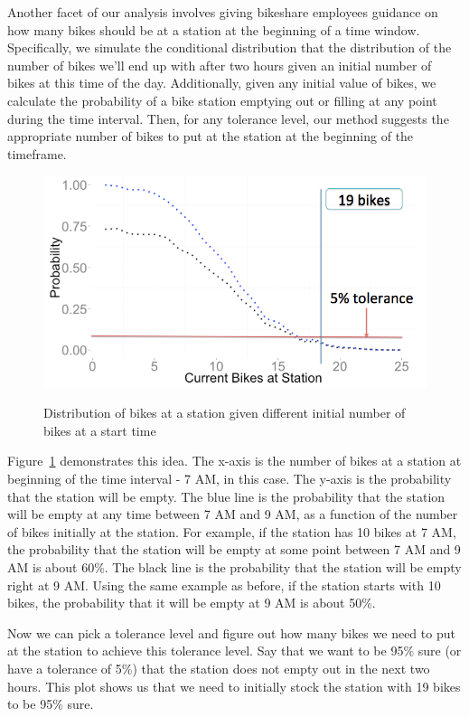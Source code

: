 \documentclass{acm_proc_article-sp}
\begin{document}
Another facet of our analysis involves giving bikeshare employees guidance on how many bikes should be at a station at the beginning of a time window. Specifically, we simulate the conditional distribution that the distribution of the number of bikes we'll end up with after two hours given an initial number of bikes at this time of the day.  Additionally, given any initial value of bikes, we calculate the probability of a bike station emptying out or filling at any point during the time interval. Then, for any tolerance level, our method suggests the appropriate number of bikes to put at the station at the beginning of the timeframe. 

\begin{figure} [!h]
\caption{Distribution of bikes at a station given different initial number of bikes at a start time}
\centering
\includegraphics[scale = 0.3]{pr_of_empty_station.png}
\label{fig:pr_of_empty_station}
\end{figure}

Figure~\ref{fig:pr_of_empty_station} demonstrates this idea. The x-axis is the number of bikes at a station at beginning of the time interval - 7 AM, in this case. The y-axis is the probability that the station will be empty. The blue line is the probability that the station will be empty at any time between 7 AM and 9 AM, as a function of the number of bikes initially at the station. For example, if the station has 10 bikes at 7 AM, the probability that the station will be empty at some point between 7 AM and 9 AM is about 60\%. The black line is the probability that the station will be empty right at 9 AM. Using the same example as before, if the station starts with 10 bikes, the probability that it will be empty at 9 AM is about 50\%.

Now we can pick a tolerance level and figure out how many bikes we need to put at the station to achieve this tolerance level. Say that we want to be 95\% sure (or have a tolerance of 5\%) that the station does not empty out in the next two hours. This plot shows us that we need to initially stock the station with 19 bikes to be 95\% sure.
\vspace{0.5cm}
\end{document}
